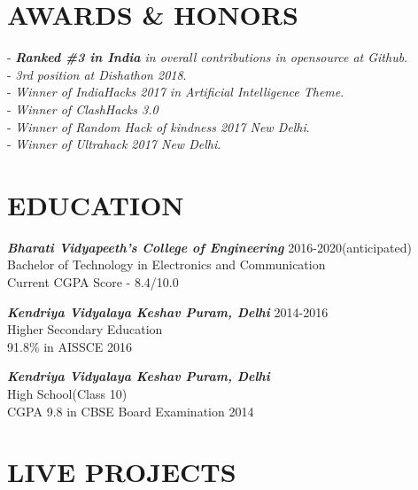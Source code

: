 \documentclass[margin, 10pt]{res}
\begin{document}
\begin{resume}
    
    
    \section{AWARDS \& HONORS}
    - {\sl {\bf Ranked \#3 in India} in overall contributions in opensource at Github}.\\
    - {\sl 3rd position at Dishathon 2018}.\\
    - {\sl Winner of IndiaHacks 2017 in Artificial Intelligence Theme}.\\
    - {\sl Winner of ClashHacks 3.0 }\\
    - {\sl Winner of Random Hack of kindness 2017 New Delhi}.\\
    - {\sl Winner of Ultrahack 2017 New Delhi}.\\
    \section{EDUCATION} 
    {\sl \bf{Bharati Vidyapeeth's College of Engineering}} \hfill 2016-2020(anticipated)\\ Bachelor of Technology in Electronics and Communication\\
    Current CGPA Score - 8.4/10.0
    
    {\sl \bf{Kendriya Vidyalaya Keshav Puram, Delhi}}
    \hfill 2014-2016 \\Higher Secondary Education\\ 91.8\% in AISSCE 2016
    
    {\sl \bf{Kendriya Vidyalaya Keshav Puram, Delhi}}\\High School(Class 10)\\CGPA 9.8 in CBSE Board Examination 2014
    

    
    \newpage
    \section{LIVE PROJECTS}


\end{resume}
\end{document}
